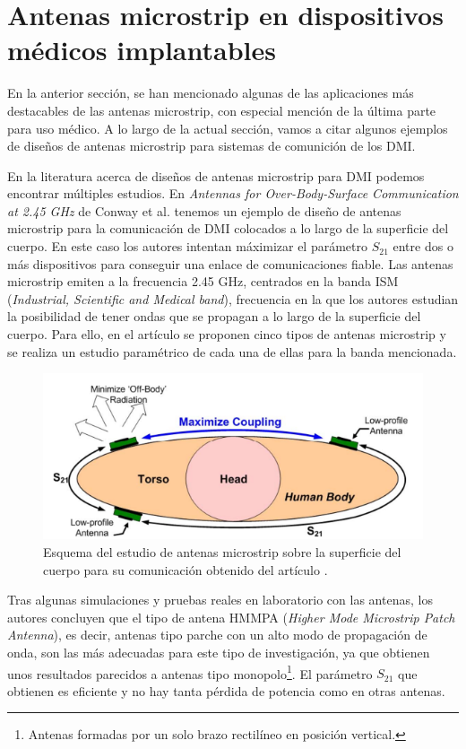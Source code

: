 \section{Antenas microstrip en dispositivos médicos implantables}\label{sec:aplicacionesdmi}

En la anterior sección, se han mencionado algunas de las aplicaciones más destacables de las antenas microstrip, con especial mención de la última parte para uso médico. A lo largo de la actual sección, vamos a citar algunos ejemplos de diseños de antenas microstrip para sistemas de comunición de los DMI.

En la literatura acerca de diseños de antenas microstrip para DMI podemos encontrar múltiples estudios. En \textit{Antennas for Over-Body-Surface Communication at 2.45 GHz} de Conway et al. \cite{conway} tenemos un ejemplo de diseño de antenas microstrip para la comunicación de DMI colocados a lo largo de la superficie del cuerpo. En este caso los autores intentan máximizar el parámetro $S_{21}$ entre dos o más dispositivos para conseguir una enlace de comunicaciones fiable. Las antenas microstrip emiten a la frecuencia 2.45 GHz, centrados en la banda ISM (\textit{Industrial, Scientific and Medical band}), frecuencia en la que los autores estudian la posibilidad de tener ondas que se propagan a lo largo de la superficie del cuerpo. Para ello, en el artículo se proponen cinco tipos de antenas microstrip y se realiza un estudio paramétrico de cada una de ellas para la banda mencionada.

\begin{figure}[!htb]
    \centering
    \includegraphics[scale=0.4]{./ContextoTecnologico/articulos/conway1}
    \caption{Esquema del estudio de antenas microstrip sobre la superficie del cuerpo para su comunicación obtenido del artículo \cite{conway}.}
    \label{fig:fig2.11}
\end{figure}

Tras algunas simulaciones y pruebas reales en laboratorio con las antenas, los autores concluyen que el tipo de antena HMMPA (\textit{Higher Mode Microstrip Patch Antenna}), es decir, antenas tipo parche con un alto modo de propagación de onda, son las más adecuadas para este tipo de investigación, ya que obtienen unos resultados parecidos a antenas tipo monopolo\footnote{Antenas formadas por un solo brazo rectilíneo en posición vertical.}. El parámetro $S_{21}$ que obtienen es eficiente y no hay tanta pérdida de potencia como en otras antenas.\\

